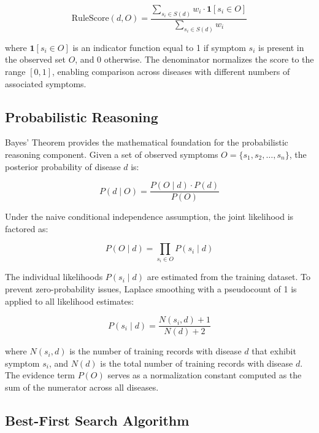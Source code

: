 \documentclass[12pt,a4paper]{article}
\begin{document}
\begin{equation}
    \text{RuleScore}(d, O) = \frac{\displaystyle\sum_{s_i \in S(d)} w_i \cdot \mathbf{1}[s_i \in O]}{\displaystyle\sum_{s_i \in S(d)} w_i}
\end{equation}

where $\mathbf{1}[s_i \in O]$ is an indicator function equal to 1 if symptom $s_i$ is present in the observed set $O$, and 0 otherwise. The denominator normalizes the score to the range $[0, 1]$, enabling comparison across diseases with different numbers of associated symptoms.

\subsection{Probabilistic Reasoning}

Bayes' Theorem provides the mathematical foundation for the probabilistic reasoning component. Given a set of observed symptoms $O = \{s_1, s_2, \ldots, s_n\}$, the posterior probability of disease $d$ is:

\begin{equation}
    P(d \mid O) = \frac{P(O \mid d) \cdot P(d)}{P(O)}
\end{equation}

Under the naive conditional independence assumption, the joint likelihood is factored as:

\begin{equation}
    P(O \mid d) = \prod_{s_i \in O} P(s_i \mid d)
\end{equation}

The individual likelihoods $P(s_i \mid d)$ are estimated from the training dataset. To prevent zero-probability issues, Laplace smoothing with a pseudocount of 1 is applied to all likelihood estimates:

\begin{equation}
    P(s_i \mid d) = \frac{N(s_i, d) + 1}{N(d) + 2}
\end{equation}

where $N(s_i, d)$ is the number of training records with disease $d$ that exhibit symptom $s_i$, and $N(d)$ is the total number of training records with disease $d$. The evidence term $P(O)$ serves as a normalization constant computed as the sum of the numerator across all diseases.

\subsection{Best-First Search Algorithm}
\end{document}
